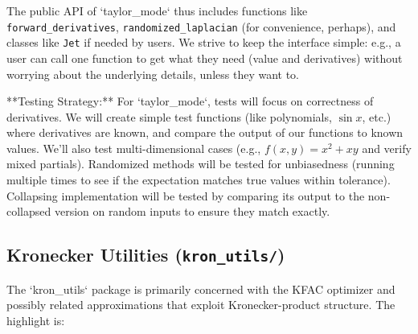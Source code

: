 \documentclass[11pt]{article}
\begin{document}
The public API of `taylor_mode` thus includes functions like \texttt{forward\_derivatives}, \texttt{randomized\_laplacian} (for convenience, perhaps), and classes like \texttt{Jet} if needed by users. We strive to keep the interface simple: e.g., a user can call one function to get what they need (value and derivatives) without worrying about the underlying details, unless they want to.

**Testing Strategy:** For `taylor_mode`, tests will focus on correctness of derivatives. We will create simple test functions (like polynomials, $\sin x$, etc.) where derivatives are known, and compare the output of our functions to known values. We'll also test multi-dimensional cases (e.g., $f(x,y) = x^2 + xy$ and verify mixed partials). Randomized methods will be tested for unbiasedness (running multiple times to see if the expectation matches true values within tolerance). Collapsing implementation will be tested by comparing its output to the non-collapsed version on random inputs to ensure they match exactly.

\subsection{Kronecker Utilities (\texttt{kron\_utils/})}

The `kron_utils` package is primarily concerned with the KFAC optimizer and possibly related approximations that exploit Kronecker-product structure. The highlight is:
\end{document}
